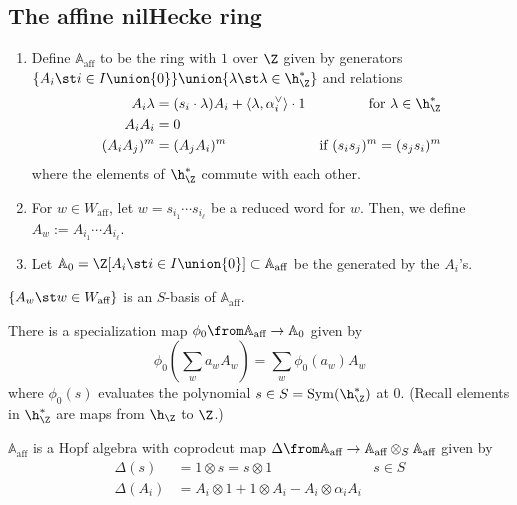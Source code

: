 \documentclass[11pt,leqno,oneside]{amsart}
\numberwithin{thm}{section}
\renewcommand{\W}{W}
\newcommand{\Waff}{\W_{\text{aff}}}
\newcommand{\A}{\mathbb{A}}
\newcommand{\Aaff}{\A_{\text{aff}}}
\begin{document}
\subsection{The affine nilHecke ring}
\begin{defn}
  \begin{enumerate}
  \item Define \(\Aaff\) to be the ring with \(1\) over \(\Z\) given by generators
    \(\{A_i \st i \in I \union \{0\}\} \union \{\lambda \st \lambda
    \in \h_\Z^*\}\) and relations
    \begin{align*}
      A_i \lambda
      & = (s_i \cdot \lambda) A_i + \langle \lambda,
        \alpha_i^\vee \rangle \cdot 1 & \text{for }\lambda \in \h_\Z^*\\
      A_i A_i & = 0 \\
      (A_i A_j)^m & = (A_jA_i)^m & \text{if }(s_i s_j)^m = (s_j s_i)^m
    \end{align*}
    where the elements of \(\h_\Z^*\) commute with each other.
  \item For \(w \in \Waff\), let \(w = s_{i_1} \cdots s_{i_\ell}\) be
    a reduced word for \(w\). Then, we define \(A_w := A_{i_1} \cdots A_{i_\ell}\).
  \item Let \(\A_0 = \Z[A_i \st i \in I \union \{0\}] \subset \Aaff\)
    be the  generated by the \(A_i\)'s.
  \end{enumerate}
\end{defn}
\begin{prop}
  \(\{A_w \st w \in \Waff\}\) is an \(S\)-basis of \(\Aaff\).
\end{prop}
There is a specialization map \(\phi_0 \from \Aaff \to \A_0\) given
by \[
  \phi_0\left( \sum_{w} a_w A_w\right) = \sum_w \phi_0(a_w) A_w
\]
where \(\phi_0(s)\) evaluates the polynomial \(s \in S =
\operatorname{Sym}(\h_\Z^*)\) at \(0\). (Recall elements in
\(\h_\Z^*\) are maps from \(\h_\Z\) to \(\Z\).)
\begin{prop}
  \(\Aaff\) is a Hopf algebra with coprodcut map \(\Delta \from \Aaff
  \to \Aaff \otimes_S \Aaff\) given by
  \begin{align*}
    \Delta(s) & = 1 \otimes s = s \otimes 1 & s \in S\\
    \Delta(A_i) & = A_i \otimes 1 + 1 \otimes A_i - A_i \otimes \alpha_i A_i
  \end{align*}
\end{prop}
\end{document}
